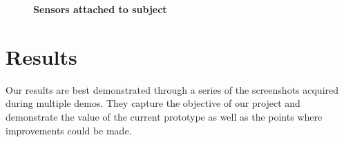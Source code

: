 \documentclass[conference]{IEEEtran}
\begin{document}
\begin{figure}[h]
  \centering
  \caption{{\bf Sensors attached to subject}
  \label{fig:attached}
  }
\end{figure}

\section{Results}
Our results are best demonstrated through a series of the screenshots acquired during
multiple demos. They capture the objective of our project and demonstrate the value of the
current prototype as well as the points where improvements could be made. 
\end{document}
